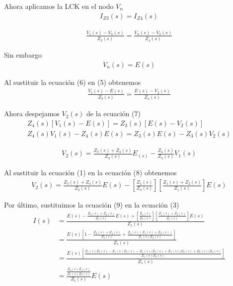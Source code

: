 \documentclass[12pt]{article}
\begin{document}
	\noindent Ahora aplicamos la LCK en el nodo $V_n$
	\begin{align}
		I_{Z3}(s) = I_{Z4}(s)
	\end{align}
	
	\begin{align}
		\frac{V_1(s) - V_n(s)}{Z_3(s)} = \frac{V_n(s) - V_2(s)}{Z_4(s)}
	\end{align}
	
	\noindent Sin embargo
	\begin{align}
		V_n(s) = E(s)
	\end{align}
	
	\noindent Al sustituir la ecuación (6) en (5) obtenemos
	\begin{align}
		\frac{V_1(s) - E(s)}{Z_3(s)} = \frac{E(s) - V_2(s)}{Z_4(s)}
	\end{align}
	
	\noindent Ahora despejamos $V_2(s)$ de la ecuación (7)
	\begin{align}
		Z_4(s)\left[ V_1(s) - E(s) \right]	= Z_3(s) \left[ E(s) - V_2(s) \right]\nonumber\\
		Z_4(s)V_1(s) - Z_4(s)E(s) = Z_3(s)E(s) - Z_3(s)V_2(s)\nonumber		 
	\end{align}
	
	\begin{align}
		V_2(s) = \frac{Z_3(s) + Z_4(s)}{Z_3(s)}E_(s) - \frac{Z_4(s)}{Z_3(s)}V_1(s)
	\end{align}
	
	\noindent Al sustituir la ecuación (1) en la ecuación (8) obtenemos
	\begin{align}
		V_2(s) = \frac{Z_3(s) + Z_4(s)}{Z_3(s)}E(s) - \left[ \frac{Z_4(s)}{Z_3(s)} \right] \left[ \frac{Z_1(s) + Z_2(s)}{Z_1(s)} \right]E(s) 
	\end{align}
	
	\noindent Por último, sustituimos la ecuación (9) en la ecuación (3)	
	\begin{align}
		I(s) &= \frac{ E(s) - \frac{Z_3(s) + Z_4(s)}{Z_3(s)}E(s) + \left[ \frac{Z_4(s)}{Z_3(s)} \right] \left[ \frac{Z_1(s) + Z_2(s)}{Z_1(s)} \right]E(s)  }{Z_5(s)}\nonumber\\
		&= \frac{ E(s)\left[ 1 - \frac{Z_3(s) + Z_4(s)}{Z_3(s)} + \frac{Z_4(s) \left( Z_1(s) + Z_2(s)\right)}{Z_1(s)Z_3(s)} \right] }{Z_5(s)}\nonumber\\
		&= \frac{E(s) \left[ \frac{ Z_1(s)Z_3(s) - Z_1(s)Z_3(s) -Z_1(s)(Z_4(s) + Z_1(s)(Z_4(s) + Z_2(s)(Z_4(s)}{Z_1(s)Z_3(s)} \right] }{Z_5(s)}\nonumber\\
		&=\frac{ \frac{Z_2(s)Z_4(s)}{Z_1(s)Z_3(s)} }{Z_5(s)}E(s)\nonumber
	\end{align}
	
\end{document}
